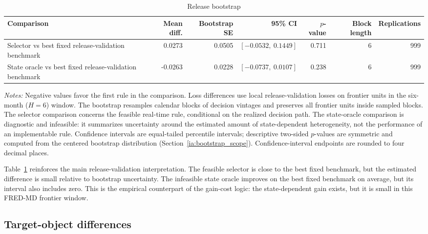 \documentclass[a4paper,12pt]{article}
\newcommand{\1}{\mathbf{1}}
\newcommand{\ExhibitNote}[1]{\begin{minipage}{0.94\textwidth}\footnotesize\emph{Notes:} #1\end{minipage}}
\begin{document}
\begin{table}[H]
\centering
\caption{Release bootstrap}
\label{tab:ia_bootstrap_release}
\small
\begin{adjustbox}{max width=\textwidth}
\begin{tabular}{@{}lrrrrrr@{}}
\toprule
Comparison & Mean diff. & Bootstrap SE & 95\% CI & $p$-value & Block length & Replications \\
\midrule
Selector vs best fixed release-validation benchmark & 0.0273 & 0.0505 & $[-0.0532,\ 0.1449]$ & 0.711 & 6 & 999 \\
State oracle vs best fixed release-validation benchmark & -0.0263 & 0.0228 & $[-0.0737,\ 0.0107]$ & 0.238 & 6 & 999 \\
\bottomrule
\end{tabular}
\end{adjustbox}
\par\medskip
\ExhibitNote{Negative values favor the first rule in the comparison. Loss differences use local release-validation losses on frontier units in the six-month ($H=6$) window. The bootstrap resamples calendar blocks of decision vintages and preserves all frontier units inside sampled blocks. The selector comparison concerns the feasible real-time rule, conditional on the realized decision path. The state-oracle comparison is diagnostic and infeasible: it summarizes uncertainty around the estimated amount of state-dependent heterogeneity, not the performance of an implementable rule. Confidence intervals are equal-tailed percentile intervals; descriptive two-sided $p$-values are symmetric and computed from the centered bootstrap distribution (Section~\ref{ia:bootstrap_scope}). Confidence-interval endpoints are rounded to four decimal places.}
\end{table}

Table~\ref{tab:ia_bootstrap_release} reinforces the main release-validation interpretation. The feasible selector is close to the best fixed benchmark, but the estimated difference is small relative to bootstrap uncertainty. The infeasible state oracle improves on the best fixed benchmark on average, but its interval also includes zero. This is the empirical counterpart of the gain-cost logic: the state-dependent gain exists, but it is small in this FRED-MD frontier window.

\subsection{Target-object differences}
\label{ia:target_bootstrap}
\end{document}
